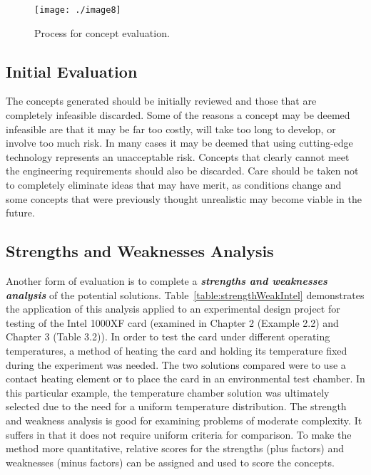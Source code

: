 \begin{figure}
\texttt{[image: ./image8]}
\caption{Process for concept evaluation.}
\label{figure:conceptFan}
\end{figure}


\subsection{Initial Evaluation}
\label{subsection:initial-evaluation}

The concepts generated should be initially reviewed and those that are
completely infeasible discarded. Some of the reasons a concept may be
deemed infeasible are that it may be far too costly, will take too long
to develop, or involve too much risk. In many cases it may be deemed
that using cutting-edge technology represents an unacceptable risk.
Concepts that clearly cannot meet the engineering requirements should
also be discarded. Care should be taken not to completely eliminate
ideas that may have merit, as conditions change and some concepts that
were previously thought unrealistic may become viable in the future.

\subsection{Strengths and Weaknesses Analysis}
\label{subsection:strengths-and-weaknesses-analysis}

Another form of evaluation is to complete a \emph{\textbf{strengths and
weaknesses analysis}} of the potential solutions. 
Table~\ref{table:strengthWeakIntel} demonstrates
the application of this analysis applied to an experi­mental design
project for testing of the Intel 1000XF card (examined in Chapter 2
(Example 2.2) and Chapter 3 (Table 3.2)). In order to test the card
under different operating temperatures, a method of heating the card and
holding its temperature fixed during the experiment was needed. The two
solutions compared were to use a contact heating element or to place the
card in an environmental test chamber. In this particular example, the
temperature chamber solution was ultimately selected due to the need for
a uniform temperature distribution. The strength and weakness analysis
is good for examining problems of moderate complexity. It suffers in
that it does not require uniform criteria for comparison. To make the
method more quantitative, relative scores for the strengths (plus
factors) and weaknesses (minus factors) can be assigned and used to
score the concepts.

